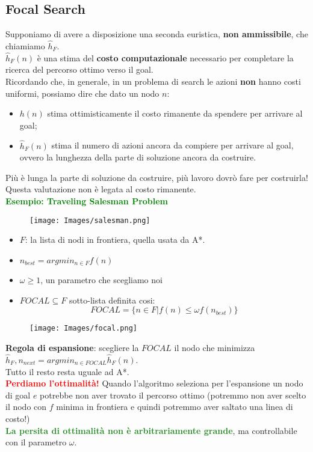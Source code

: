 \documentclass{article}
\begin{document}
\subsection{Focal Search}
Supponiamo di avere a disposizione una seconda euristica, \textbf{non ammissibile}, che chiamiamo $\hat{h}_F$.
\\ $\hat{h}_F(n)$ è una stima del \textbf{costo computazionale} necessario per completare la ricerca del percorso ottimo verso il goal.
\\ Ricordando che, in generale, in un problema di search le azioni \textbf{non} hanno costi uniformi, possiamo dire che dato un nodo $n$:
\begin{itemize}
    \item $h(n)$ stima ottimisticamente il costo rimanente da spendere per arrivare al goal;
    \item $\hat{h}_F(n)$ stima il numero di azioni ancora da compiere per arrivare al goal, ovvero la lunghezza della parte di soluzione ancora da costruire.
\end{itemize} 
Più è lunga la parte di soluzione da costruire, più lavoro dovrò fare per costruirla! Questa valutazione non è legata al costo rimanente.
\\ \textcolor{green}{\textbf{Esempio: Traveling Salesman Problem}}
\begin{figure}[H]
    \texttt{[image: Images/salesman.png]}
\end{figure}
\begin{itemize}
    \item $F$: la lista di nodi in frontiera, quella usata da A*.
    \item $n_{best} = arg min_{n \in F} f(n)$
    \item $\omega \geq 1$, un parametro che scegliamo noi 
    \item $FOCAL \subseteq F$ sotto-lista definita cosi: \[FOCAL = \{n \in F | f(n) \leq \omega f(n_{best})\} \]
\end{itemize}
\begin{figure}[H]
    \centering
    \texttt{[image: Images/focal.png]}
\end{figure}
\textbf{Regola di espansione}: scegliere la $FOCAL$ il nodo che minimizza $\hat{h}_F, n_{next} = arg min_{n \in FOCAL} \hat{h}_F(n)$.
\\ Tutto il resto resta uguale ad A*.
\\ \textcolor{red}{\textbf{Perdiamo l'ottimalità!}} Quando l'algoritmo seleziona per l'espansione un nodo di goal $e$ potrebbe non aver trovato il percorso ottimo
(potremmo non aver scelto il nodo con $f$ minima in frontiera e quindi potremmo aver saltato una linea di costo!)
\\ \textcolor{ForestGreen}{\textbf{La persita di ottimalità non è arbitrariamente grande}}, ma controllabile con il parametro $\omega$.
\end{document}
